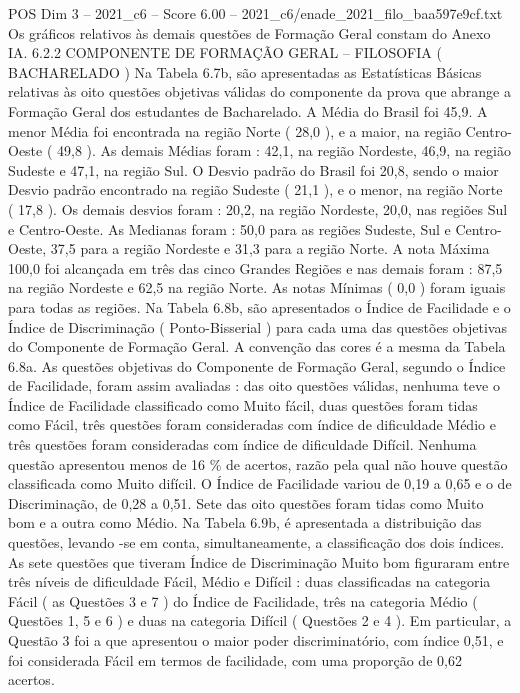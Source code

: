 \begin{textsample}{POS Dim 3 – 2021\_c6 – Score 6.00 – 2021\_c6/enade\_2021\_filo\_baa597e9cf.txt}
Os gráficos relativos às demais questões de Formação Geral constam do Anexo IA. 6.2.2 COMPONENTE DE FORMAÇÃO GERAL – FILOSOFIA ( BACHARELADO ) Na Tabela 6.7b, são apresentadas as Estatísticas Básicas relativas às oito questões objetivas válidas do componente da prova que abrange a Formação Geral dos estudantes de Bacharelado.
A Média do Brasil foi 45,9.
A menor Média foi encontrada na região Norte ( 28,0 ), e a maior, na região Centro-Oeste ( 49,8 ).
As demais Médias foram : 42,1, na região Nordeste, 46,9, na região Sudeste e 47,1, na região Sul.
O Desvio padrão do Brasil foi 20,8, sendo o maior Desvio padrão encontrado na região Sudeste ( 21,1 ), e o menor, na região Norte ( 17,8 ).
Os demais desvios foram : 20,2, na região Nordeste, 20,0, nas regiões Sul e Centro-Oeste.
As Medianas foram : 50,0 para as regiões Sudeste, Sul e Centro-Oeste, 37,5 para a região Nordeste e 31,3 para a região Norte.
A nota Máxima 100,0 foi alcançada em três das cinco Grandes Regiões e nas demais foram : 87,5 na região Nordeste e 62,5 na região Norte.
As notas Mínimas ( 0,0 ) foram iguais para todas as regiões.
Na Tabela 6.8b, são apresentados o Índice de Facilidade e o Índice de Discriminação ( Ponto-Bisserial ) para cada uma das questões objetivas do Componente de Formação Geral.
A convenção das cores é a mesma da Tabela 6.8a.
As questões objetivas do Componente de Formação Geral, segundo o Índice de Facilidade, foram assim avaliadas : das oito questões válidas, nenhuma teve o Índice de Facilidade classificado como Muito fácil, duas questões foram tidas como Fácil, três questões foram consideradas com índice de dificuldade Médio e três questões foram consideradas com índice de dificuldade Difícil.
Nenhuma questão apresentou menos de 16 \% de acertos, razão pela qual não houve questão classificada como Muito difícil.
O Índice de Facilidade variou de 0,19 a 0,65 e o de Discriminação, de 0,28 a 0,51.
Sete das oito questões foram tidas como Muito bom e a outra como Médio.
Na Tabela 6.9b, é apresentada a distribuição das questões, levando -se em conta, simultaneamente, a classificação dos dois índices.
As sete questões que tiveram Índice de Discriminação Muito bom figuraram entre três níveis de dificuldade Fácil, Médio e Difícil : duas classificadas na categoria Fácil ( as Questões 3 e 7 ) do Índice de Facilidade, três na categoria Médio ( Questões 1, 5 e 6 ) e duas na categoria Difícil ( Questões 2 e 4 ).
Em particular, a Questão 3 foi a que apresentou o maior poder discriminatório, com índice 0,51, e foi considerada Fácil em termos de facilidade, com uma proporção de 0,62 acertos.

\end{textsample}

